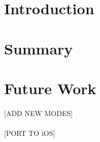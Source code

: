 \section{Introduction}

\section{Summary}

\section{Future Work}
	\paragraph{}{
	[ADD NEW MODES]
	}
	
	\paragraph{}{
	[PORT TO iOS]
	}
